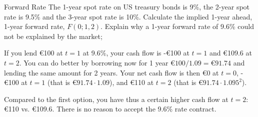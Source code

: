 \documentclass{beamer}
\begin{document}
\begin{frame}{}
\begin{block}{Forward Rate}
The 1-year spot rate on US treasury bonds is 9\%, the 2-year spot rate is 9.5\% and the 3-year spot rate is 10\%. 
Calculate the implied 1-year ahead, 1-year forward rate, $F(0;1,2)$. Explain why a 1-year forward rate of 9.6\% could not be explained by the market;
\end{block}
\end{frame}

\begin{frame}{}
If you lend €100 at $t=1$ at 9.6\%, your cash flow is -€100 at $t=1$ and €109.6 at $t=2$. 
You can do better by borrowing now for 1 year $€100/1.09=€91.74$ and lending the same amount for 2 years. Your net cash flow is then €0 at $t=0$, -€100 at $t=1$ (that is $€91.74\cdot 1.09$), and €110 at $t=2$ (that is $€91.74\cdot 1.095^2$). 

Compared to the first option, you have thus a certain higher cash flow at $t=2$: €110 vs. €109.6.  There is no reason to accept the 9.6\% rate contract. 
\end{frame}
\end{document}
